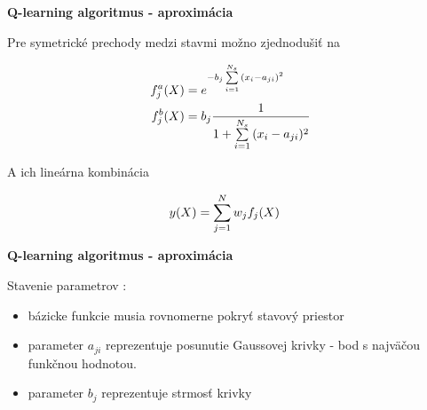 \documentclass[xcolor=dvipsnames]{beamer}
\begin{document}
\begin{frame}{\bf Q-learning algoritmus - aproximácia}

Pre symetrické prechody medzi stavmi možno zjednodušiť na

\begin{align}
    f_j^a(\boldmath{X}) &= e^{ -b_j\sum\limits_{i=1}^{N_s}{(x_i - a_{ji})^2} } \nonumber \\
    f_j^b(\boldmath{X}) &= b_{j}\frac{1}{1 + \sum\limits_{i=1}^{N_s}{(x_i - a_{ji})^2}} \nonumber
\end{align}

A ich lineárna kombinácia

\begin{align}
    y(\boldmath{X})&= \sum\limits_{j=1}^{N}w_jf_j(\boldmath{X}) \nonumber
\end{align}



\end{frame}







\begin{frame}{\bf Q-learning algoritmus - aproximácia}

Stavenie parametrov :

\begin{itemize}
\item bázicke funkcie musia rovnomerne pokryť stavový priestor
\item parameter $a_{ji}$ reprezentuje posunutie Gaussovej krivky - bod s najväčou funkčnou hodnotou.
\item parameter $b_{j}$ reprezentuje strmosť krivky
\end{itemize}

\end{frame}
\end{document}
